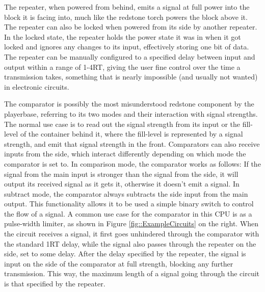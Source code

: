 The repeater, when powered from behind, emits a signal at full power into the block it is facing into, much like the redstone torch powers the block above it. The repeater can also be locked when powered from its side by another repeater. In the locked state, the repeater holds the power state it was in when it got locked and ignores any changes to its input, effectively storing one bit of data. The repeater can be manually configured to a specified delay between input and output within a range of 1-4RT, giving the user fine control over the time a transmission takes, something that is nearly impossible (and usually not wanted) in electronic circuits.

The comparator is possibly the most misunderstood redstone component by the playerbase, referring to its two modes and their interaction with signal strengths. The normal use case is to read out the signal strength from its input or the fill-level of the container behind it, where the fill-level is represented by a signal strength, and emit that signal strength in the front. Comparators can also receive inputs from the side, which interact differently depending on which mode the comparator is set to. In comparison mode, the comparator works as follows: If the signal from the main input is stronger than the signal from the side, it will output its received signal as it gets it, otherwise it doesn't emit a signal. In subtract mode, the comparator always subtracts the side input from the main output. This functionality allows it to be used a simple binary switch to control the flow of a signal. A common use case for the comparator in this CPU is as a pulse-width limiter, as shown in Figure \ref{fig::ExampleCircuits} on the right. When the circuit receives a signal, it first goes unhindered through the comparator with the standard 1RT delay, while the signal also passes through the repeater on the side, set to some delay. After the delay specified by the repeater, the signal is input on the side of the comparator at full strength, blocking any further transmission. This way, the maximum length of a signal going through the circuit is that specified by the repeater.

